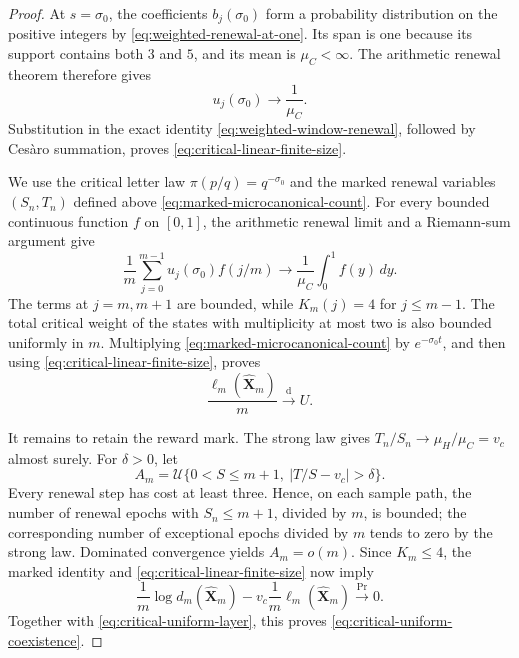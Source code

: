\begin{proof}
At \(s=\sigma_0\), the coefficients \(b_j(\sigma_0)\) form a probability
distribution on the positive integers by
\eqref{eq:weighted-renewal-at-one}.  Its span is one because its support
contains both \(3\) and \(5\), and its mean is \(\mu_C<\infty\).  The
arithmetic renewal theorem therefore gives
\[
 u_j(\sigma_0)\longrightarrow\frac1{\mu_C}.
\]
Substitution in the exact identity
\eqref{eq:weighted-window-renewal}, followed by Ces\`aro summation, proves
\eqref{eq:critical-linear-finite-size}.

We use the critical letter law \(\pi(p/q)=q^{-\sigma_0}\) and the marked
renewal variables \((S_n,T_n)\) defined above
\eqref{eq:marked-microcanonical-count}.  For every bounded continuous
function \(f\) on \([0,1]\), the arithmetic renewal limit and a Riemann-sum
argument give
\[
 \frac1m\sum_{j=0}^{m-1}u_j(\sigma_0)f(j/m)
 \longrightarrow\frac1{\mu_C}\int_0^1 f(y)\,dy.
\]
The terms at \(j=m,m+1\) are bounded, while
\(K_m(j)=4\) for \(j\le m-1\).  The total critical weight of the states
with multiplicity at most two is also bounded uniformly in \(m\).
Multiplying \eqref{eq:marked-microcanonical-count} by
\(e^{-\sigma_0t}\), and then using
\eqref{eq:critical-linear-finite-size}, proves
\begin{equation}
 \frac{\ell_m(\widehat{\mathbf X}_m)}m
 \xrightarrow{\mathrm d}U.
 \label{eq:critical-uniform-layer}
\end{equation}

It remains to retain the reward mark.  The strong law gives
\(T_n/S_n\to\mu_H/\mu_C=v_c\) almost surely.  For \(\delta>0\), let
\[
 A_m=\mathcal U\{0<S\le m+1,\ |T/S-v_c|>\delta\}.
\]
Every renewal step has cost at least three.  Hence, on each sample path, the
number of renewal epochs with \(S_n\le m+1\), divided by \(m\), is bounded;
the corresponding number of exceptional epochs divided by \(m\) tends to
zero by the strong law.  Dominated convergence yields \(A_m=o(m)\).
Since \(K_m\le4\), the marked identity and
\eqref{eq:critical-linear-finite-size} now imply
\[
 \frac1m\log d_m(\widehat{\mathbf X}_m)
 -v_c\frac1m\ell_m(\widehat{\mathbf X}_m)
 \xrightarrow{\Pr}0.
\]
Together with \eqref{eq:critical-uniform-layer}, this proves
\eqref{eq:critical-uniform-coexistence}.
\end{proof}

